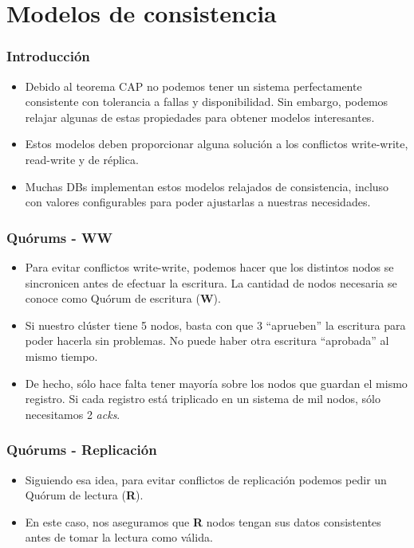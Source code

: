 \section{Modelos de consistencia}

\begin{frame}
\frametitle{Introducción}
\begin{itemize}
\item	Debido al teorema CAP no podemos tener un sistema
	perfectamente consistente con tolerancia a fallas
	y disponibilidad. Sin embargo, podemos relajar algunas
	de estas propiedades para obtener modelos interesantes.
	\pause

\item	Estos modelos deben proporcionar alguna solución a los
	conflictos write-write, read-write y de réplica.
	\pause

\item	Muchas DBs implementan estos modelos relajados de consistencia,
	incluso con valores configurables para poder ajustarlas a nuestras
	necesidades.
\end{itemize}
\end{frame}

\begin{frame}
\frametitle{Quórums - WW}
\begin{itemize}
\item	Para evitar conflictos write-write, podemos hacer que los
	distintos nodos se sincronicen antes de efectuar la escritura.
	La cantidad de nodos necesaria se conoce como Quórum de escritura
	(\textbf{W}).
	\pause

\item	Si nuestro clúster tiene 5 nodos, basta con que 3 ``aprueben''
	la escritura para poder hacerla sin problemas. No puede haber otra
	escritura ``aprobada'' al mismo tiempo.
	\pause

\item	De hecho, sólo hace falta tener mayoría sobre los nodos que
	guardan el mismo registro. Si cada registro está triplicado
	en un sistema de mil nodos, sólo necesitamos 2 \textit{acks}.
\end{itemize}
\end{frame}

\begin{frame}
\frametitle{Quórums - Replicación}
\begin{itemize}
\item	Siguiendo esa idea, para evitar conflictos de replicación
	podemos pedir un Quórum de lectura (\textbf{R}).
	\pause

\item	En este caso, nos aseguramos que \textbf{R} nodos tengan
	sus datos consistentes antes de tomar la lectura como válida.
\end{itemize}
\end{frame}

